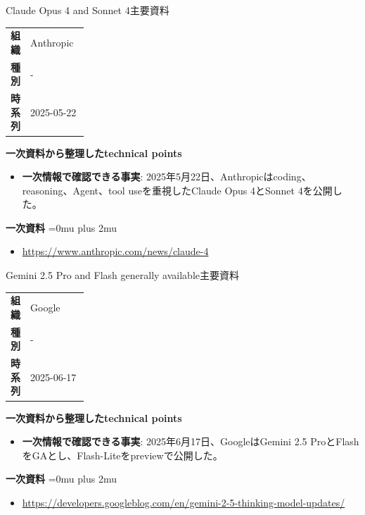 \begin{technicalnote}{Claude Opus 4 and Sonnet 4}{主要資料}
\begingroup
\begin{tabularx}{\linewidth}{@{}>{\bfseries}p{0.22\linewidth}X@{}}
組織 & Anthropic \\
種別 & - \\
時系列 & 2025-05-22 \\
\end{tabularx}
\smallskip
{\bfseries 一次資料から整理したtechnical points}
\begin{itemize}[leftmargin=1.5em,itemsep=0.35em]
\item \textbf{一次情報で確認できる事実}: 2025年5月22日、Anthropicはcoding、reasoning、Agent、tool useを重視したClaude Opus 4とSonnet 4を公開した。
\end{itemize}
\begin{samepage}
{\bfseries 一次資料}
\begingroup\sloppy
\Urlmuskip=0mu plus 2mu\relax
\begin{itemize}[leftmargin=1.5em,itemsep=0.25em]
\item {\scriptsize\url{https://www.anthropic.com/news/claude-4}}
\end{itemize}
\endgroup
\end{samepage}
\endgroup
\end{technicalnote}
\medskip

\begin{technicalnote}{Gemini 2.5 Pro and Flash generally available}{主要資料}
\begingroup
\begin{tabularx}{\linewidth}{@{}>{\bfseries}p{0.22\linewidth}X@{}}
組織 & Google \\
種別 & - \\
時系列 & 2025-06-17 \\
\end{tabularx}
\smallskip
{\bfseries 一次資料から整理したtechnical points}
\begin{itemize}[leftmargin=1.5em,itemsep=0.35em]
\item \textbf{一次情報で確認できる事実}: 2025年6月17日、GoogleはGemini 2.5 ProとFlashをGAとし、Flash-Liteをpreviewで公開した。
\end{itemize}
\begin{samepage}
{\bfseries 一次資料}
\begingroup\sloppy
\Urlmuskip=0mu plus 2mu\relax
\begin{itemize}[leftmargin=1.5em,itemsep=0.25em]
\item {\scriptsize\url{https://developers.googleblog.com/en/gemini-2-5-thinking-model-updates/}}
\end{itemize}
\endgroup
\end{samepage}
\endgroup
\end{technicalnote}
\medskip
